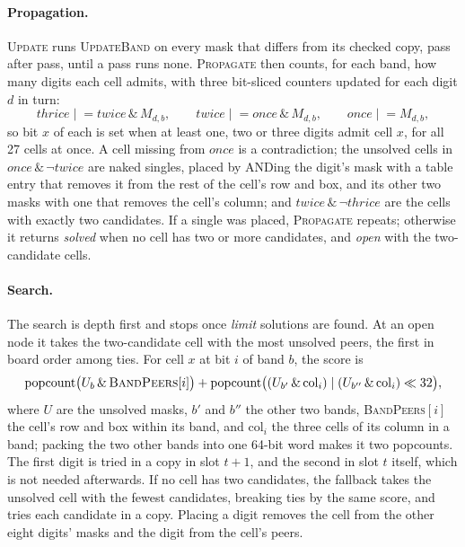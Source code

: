 \documentclass[11pt]{article}
\theoremstyle{definition}
\theoremstyle{plain}
\let\origtextsc\textsc
\renewcommand{\textsc}[1]{\textup{\origtextsc{#1}}}
\begin{document}
\paragraph{Propagation.} \textsc{Update} runs \textsc{UpdateBand} on every mask that differs from its checked copy,
pass after pass, until a pass runs none. \textsc{Propagate} then counts, for each band, how many digits each cell
admits, with three bit-sliced counters updated for each digit $d$ in turn:
\[
\mathit{thrice} \mathrel{|}= \mathit{twice}\,\&\,M_{d,b}, \qquad
\mathit{twice} \mathrel{|}= \mathit{once}\,\&\,M_{d,b}, \qquad
\mathit{once} \mathrel{|}= M_{d,b},
\]
so bit $x$ of each is set when at least one, two or three digits admit cell $x$, for all 27 cells at once. A cell
missing from $\mathit{once}$ is a contradiction; the unsolved cells in $\mathit{once}\,\&\,\lnot\mathit{twice}$ are
naked singles, placed by ANDing the digit's mask with a table entry that removes it from the rest of the cell's row and
box, and its other two masks with one that removes the cell's column; and $\mathit{twice}\,\&\,\lnot\mathit{thrice}$
are the cells with exactly two candidates. If a single was placed, \textsc{Propagate} repeats; otherwise it returns
\emph{solved} when no cell has two or more candidates, and \emph{open} with the two-candidate cells.

\paragraph{Search.} The search is depth first and stops once \emph{limit} solutions are found. At an open node it takes
the two-candidate cell with the most unsolved peers, the first in board order among ties. For cell $x$ at bit $i$ of
band $b$, the score is
\[
\mathrm{popcount}\bigl(U_b \,\&\, \textsc{BandPeers}[i]\bigr) + \mathrm{popcount}\bigl((U_{b'} \,\&\, \mathrm{col}_i) \mid
(U_{b''} \,\&\, \mathrm{col}_i)\ll 32\bigr),
\]
where $U$ are the unsolved masks, $b'$ and $b''$ the other two bands, \textsc{BandPeers}$[i]$ the cell's row and box
within its band, and $\mathrm{col}_i$ the three cells of its column in a band; packing the two other bands into one
64-bit word makes it two popcounts. The first digit is tried in a copy in slot $t+1$, and the second in slot $t$
itself, which is not needed afterwards. If no cell has two candidates, the fallback takes the unsolved cell with the
fewest candidates, breaking ties by the same score, and tries each candidate in a copy. Placing a digit removes the
cell from the other eight digits' masks and the digit from the cell's peers.
\end{document}
